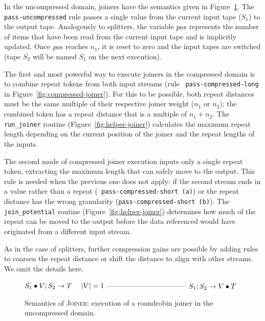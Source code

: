 In the uncompressed domain, joiners have the semantics given in
Figure~\ref{fig:uncompressed-joiner}.  The {\tt pass-uncompressed}
rule passes a single value from the current input tape ($S_1$) to the
output tape.  Analogously to splitters, the variable $\mbox{\it pos}$ represents
the number of items that have been read from the current input tape
and is implicitly updated.  Once $\mbox{\it pos}$ reaches $n_1$, it is reset to
zero and the input tapes are switched (tape $S_2$ will be named $S_1$
on the next execution).

The first and most powerful way to execute joiners in the compressed
domain is to combine repeat tokens from both input streams (rule {\tt
  pass-compressed-long} in Figure~\ref{fig:compressed-joiner}).  For
this to be possible, both repeat distances must be the same multiple
of their respective joiner weight ($n_1$ or $n_2$); the combined token
has a repeat distance that is a multiple of $n_1 + n_2$.  The {\tt
  run\_joiner} routine (Figure~\ref{fig:helper-joiner}) calculates the
maximum repeat length depending on the current position of the joiner
and the repeat lengths of the inputs.

The second mode of compressed joiner execution inputs only a single
repeat token, extracting the maximum length that can safely move to
the output.  This rule is needed when the previous one does not apply:
if the second stream ends in a value rather than a repeat ({\tt
  pass-compressed-short (a)}) or the repeat distance has the wrong
granularity ({\tt pass-compressed-short (b)}).  The {\tt
  join\_potential} routine (Figure~\ref{fig:helper-joiner}) determines
how much of the repeat can be moved to the output before the data
referenced would have originated from a different input stream.

As in the case of splitters, further compression gains are possible by
adding rules to coarsen the repeat distance or shift the distance to
align with other streams.  We omit the details here.

\begin{figure}[t]
$S_1 \bullet V; S_2 \rightarrow T~~~~|V|=1$\skiptopb
---------------------------------\skipbot
$S_1; S_2 \rightarrow V \bullet T$
\caption{Semantics of \textsc{Joiner}: execution of a roundrobin
  joiner in the uncompressed domain.
\protect\label{fig:uncompressed-joiner}}
\end{figure}

